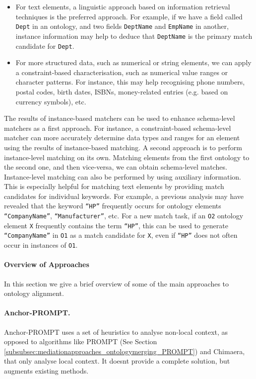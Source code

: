 \begin{itemize}
\item For text elements, a linguistic approach based on information
retrieval techniques is the preferred approach. For example, if we have
a field called \texttt{Dept} in an ontology, and two
fields \texttt{DeptName} and \texttt{EmpName}
in another, instance information may help to deduce that
\texttt{DeptName} is the primary match candidate for
\texttt{Dept}. 
\item For more structured data, such as numerical or string elements, we
can apply a constraint-based characterisation, such as numerical value
ranges or character patterns. For instance, this may help recognising
phone numbers, postal codes, birth dates, ISBNs, money-related entries
(e.g. based on currency symbols), etc. 
\end{itemize}
The results of instance-based matchers can be used to enhance
schema-level matchers as a first approach. For instance, a
constraint-based schema-level matcher can more accurately determine
data types and ranges for an element using the results of
instance-based matching. A second approach is to perform instance-level
matching on its own. Matching elements from the first ontology to the
second one, and then vice-versa, we can obtain schema-level matches.
Instance-level matching can also be performed by using auxiliary
information. This is especially helpful for matching text elements by
providing match candidates for individual keywords. For example, a
previous analysis may have revealed that the keyword
\texttt{{\textquotedblleft}HP{\textquotedblright}}
frequently occurs for ontology elements
\texttt{{\textquotedblleft}CompanyName{\textquotedblright}},
\texttt{{\textquotedblleft}Manufacturer{\textquotedblright}},
etc. For a new match task, if an \texttt{O2} ontology
element \texttt{X} frequently contains the term
\texttt{{\textquotedblleft}HP{\textquotedblright}}, this
can be used to generate
\texttt{{\textquotedblleft}CompanyName{\textquotedblright}}
in \texttt{O1} as a match candidate for
\texttt{X}, even if
\texttt{{\textquotedblleft}HP{\textquotedblright}} does
not often occur in instances of \texttt{O1}. 

\paragraph{Overview of Approaches}
In this section we give a brief overview of some of the main approaches
to ontology alignment. 

\paragraph{Anchor-PROMPT.}
Anchor-PROMPT \cite{noy2000anchor_prompt} uses a set of heuristics to analyse
non-local context, as opposed to algorithms like PROMPT \cite{noy2000prompt} 
(See Section \ref{subsubsec:mediationapproaches_ontologymerging_PROMPT}) and Chimaera, that only analyse local context.
It doesn{\textquotesingle}t provide a complete solution, but augments
existing methods. 


